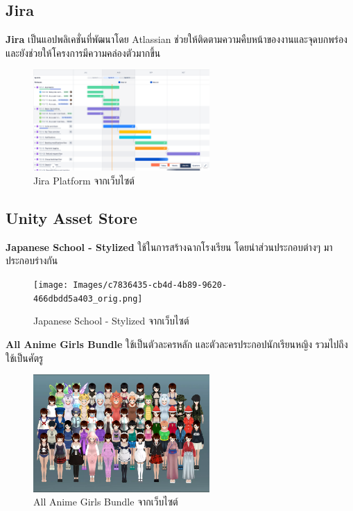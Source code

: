 \subsection{Jira}
\subsubitem \textbf{Jira} \cite{jira:program} เป็นแอปพลิเคชั่นที่พัฒนาโดย Atlassian ช่วยให้ติดตามความคืบหน้าของงานและจุดบกพร่อง และยังช่วยให้โครงการมีความคล่องตัวมากขึ้น
\begin{figure}[h]
  \centering
  \includegraphics[width=0.6\textwidth, height=0.2\textheight]{Images/screen-roadmaps.png}
  \caption{Jira Platform จากเว็บไซต์}
\end{figure}


\subsection{Unity Asset Store}
\subsubitem \textbf{Japanese School - Stylized} \cite{japanese-school:asset} ใช้ในการสร้างฉากโรงเรียน โดยนำส่วนประกอบต่างๆ มาประกอบร่างกัน
\begin{figure}[h]
  \centering
  \texttt{[image: Images/c7836435-cb4d-4b89-9620-466dbdd5a403\_orig.png]}
  \caption{Japanese School - Stylized จากเว็บไซต์}\label{JapaneseSchool}
\end{figure}


\subsubitem \textbf{All Anime Girls Bundle} \cite{All-Anime-Girls-Bundle:asset} ใช้เป็นตัวละครหลัก และตัวละครประกอปนักเรียนหญิง รวมไปถึงใช้เป็นศัตรู
\begin{figure}[h]
  \centering
  \includegraphics[width=0.6\textwidth, height=0.2\textheight]{Images/All Anime Girls Bundle.png}
  \caption{All Anime Girls Bundle จากเว็บไซต์}\label{All Anime Girls Bundle}
\end{figure}


